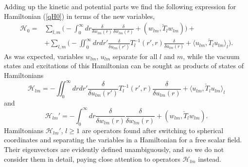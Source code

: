 \documentclass[12pt]{article}
\newcommand{\HH}{\mathscr{H}}
\begin{document}
	Adding up the kinetic and potential parts we find the following
	expression for Hamiltonian
(\ref{qH0})
	in terms of the new variables,
\begin{align*}
    \HH_{0} =& \sum_{l,m} \bigl( -\int_{0}^{\infty} dr
	\frac{\delta}{\delta w_{lm}(r)} \frac{\delta}{\delta w_{lm}(r)}
	    + (w_{lm},\check{T}_{l} w_{lm})\bigr)+\\
    &+ \sum_{l,m} \bigl(-\iint_{0}^{\infty} dr dr'
    \frac{\delta}{\delta u_{lm}(r')} T_{l}^{-1}(r',r)
	\frac{\delta}{\delta u_{lm}(r)}
	    + \langle u_{lm}, \check{T}_{l} u_{lm}\rangle_{l} \bigr).
\end{align*}
	As was expected, variables
$ w_{lm} $, 
$ u_{lm} $
	separate for all
$ l $ and $ m $,
	while the vacuum states and excitations of this Hamiltonian
	can be sought as products of states of Hamiltonians
\begin{equation*}
    \HH_{lm} = -\iint_{0}^{\infty} dr dr'
    \frac{\delta}{\delta u_{lm}(r')} T_{l}^{-1}(r',r)
	\frac{\delta}{\delta u_{lm}(r)}
	+ \langle u_{lm}, \check{T}_{l}u_{lm}\rangle_{l}
\end{equation*}
	and
\begin{equation*}
    \HH_{lm}' = -\int_{0}^{\infty} dr
	\frac{\delta}{\delta w_{lm}(r)} \frac{\delta}{\delta w_{lm}(r)}
	    + (w_{lm},\check{T}_{l} w_{lm}) .
\end{equation*}
	Hamiltonians
$ \HH_{lm}' $,
$ l \geq 1 $
	are operators found after switching to spherical coordinates
	and separating the variables in a Hamiltonian for
	a free scalar field.
	Their eigenvectors are evidently defined unambiguously,
	and so we do not consider them in detail,
	paying close attention to operators
$ \HH_{lm} $ instead.



\end{document}
